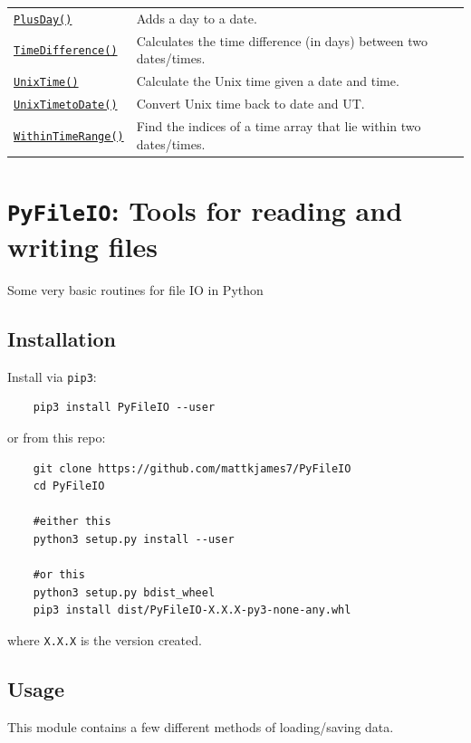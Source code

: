 \begin{tabular}{|l|l|}
	\href{include/datetime.h#L292}{\texttt{PlusDay()}} & Adds a day to a date. \\
	\href{include/datetime.h#L310}{\texttt{TimeDifference()}} & Calculates the time difference (in days) between two dates/times. \\
	\href{include/datetime.h#L329}{\texttt{UnixTime()}} & Calculate the Unix time given a date and time. \\
	\href{include/datetime.h#L346}{\texttt{UnixTimetoDate()}} & Convert Unix time back to date and UT. \\
	\href{include/datetime.h#L369}{\texttt{WithinTimeRange()}} & Find the indices of a time array that lie within two dates/times. \\
	\hline
	\end{tabular}
	

	\section{\texttt{PyFileIO}: Tools for reading and writing files}


	Some very basic routines for file IO in Python
	
	\subsection{Installation}
	
	Install via \texttt{pip3}:
	
	\begin{verbatim}
	pip3 install PyFileIO --user
	\end{verbatim}
	
	or from this repo:
	
	\begin{verbatim}
	git clone https://github.com/mattkjames7/PyFileIO
	cd PyFileIO
	
	#either this
	python3 setup.py install --user
	
	#or this
	python3 setup.py bdist_wheel
	pip3 install dist/PyFileIO-X.X.X-py3-none-any.whl
	\end{verbatim}
	
	where \texttt{X.X.X} is the version created.
	
	\subsection{Usage}
	
	This module contains a few different methods of loading/saving data.
	
